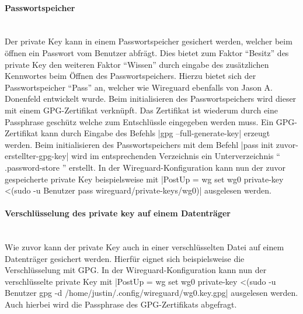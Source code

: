 \paragraph{Passwortspeicher} 
\noindent \\Der private Key kann in einem Passwortspeicher gesichert werden, welcher beim \"offnen ein Passwort vom Benutzer abfr\"agt. Dies bietet zum Faktor "`Besitz"' des private Key den weiteren Faktor "`Wissen"' durch eingabe des zus\"atzlichen Kennwortes beim \"Offnen des Passwortspeichers. Hierzu bietet sich der Passwortspeicher "`Pass"' an, welcher wie Wireguard ebenfalls von Jason A. Donenfeld entwickelt wurde. Beim initialisieren des Passwortspeichers wird dieser mit einem GPG-Zertifikat verknüpft. Das Zertifikat ist wiederum durch eine Passphrase gesch\"utz welche zum Entschlüssle eingegeben werden muss.
Ein GPG-Zertifikat kann durch Eingabe des Befehls |gpg --full-generate-key| erzeugt werden. Beim initialisieren des Passwortspeichers mit dem Befehl |pass init zuvor-erstellter-gpg-key| wird im entsprechenden Verzeichnis ein Unterverzeichnis \enquote{ .password-store } erstellt. In der Wireguard-Konfiguration kann nun der zuvor gespeicherte private Key beispielsweise mit |PostUp = wg set wg0 private-key <(sudo -u Benutzer pass wireguard/private-keys/wg0)| ausgelesen werden.

\paragraph{Verschl\"usselung des private key auf einem Datentr\"ager}
\noindent \\Wie zuvor kann der private Key auch in einer verschl\"usselten Datei auf einem Datentr\"ager gesichert werden. Hierfür eignet sich beispielsweise die Verschl\"usselung mit GPG. In der Wireguard-Konfiguration kann nun der verschl\"usselte private Key mit |PostUp = wg set wg0 private-key <(sudo -u Benutzer gpg -d /home/justin/.config/wireguard/wg0.key.gpg| ausgelesen werden. Auch hierbei wird die Passphrase des GPG-Zertifikats abgefragt. 

